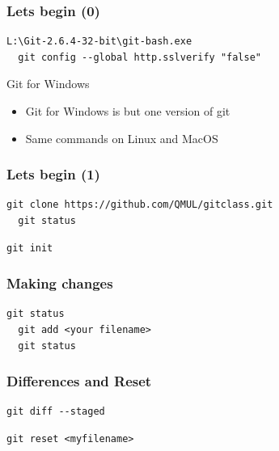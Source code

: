 \documentclass{beamer}
\begin{document}
\begin{frame}[fragile]
  \frametitle{Lets begin (0)}

  \begin{lstlisting}[caption=setup git for windows] 
  L:\Git-2.6.4-32-bit\git-bash.exe
  git config --global http.sslverify "false"
  \end{lstlisting}

 \begin{block}{Git for Windows}
   \begin{itemize}  
      \item Git for Windows is but one version of git
      \item Same commands on Linux and MacOS
    \end{itemize}
  \end{block}


\end{frame}


\begin{frame}[fragile]
  \frametitle{Lets begin (1)}

  \begin{lstlisting}[caption=clone a repository] 
  git clone https://github.com/QMUL/gitclass.git
  git status
  \end{lstlisting}

  \begin{lstlisting}[caption=create a new repository] 
  git init 
  \end{lstlisting}

\end{frame}


\begin{frame}[fragile]
  \frametitle{Making changes}
  
  \begin{lstlisting}[caption=Making changes] 
  git status
  git add <your filename>
  git status
  \end{lstlisting}

\end{frame}

\begin{frame}[fragile]
  \frametitle{Differences and Reset}
  
  \begin{lstlisting}[caption=Making changes] 
  git diff --staged
  \end{lstlisting}

  \begin{lstlisting}[caption=Reset changes] 
  git reset <myfilename>
  \end{lstlisting}

\end{frame}
\end{document}

